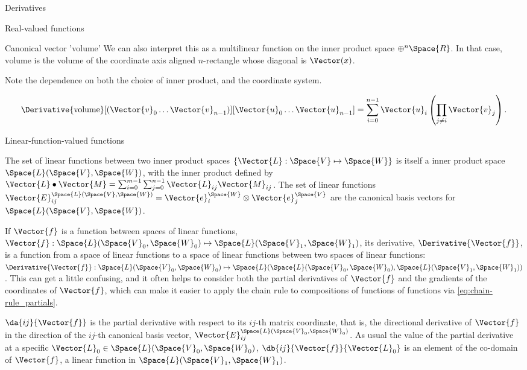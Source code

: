 \begin{plSection}{Derivatives}
\begin{plSection}{Real-valued functions}
\begin{plSection}{Canonical vector 'volume'}
We can also interpret this as a multilinear function on the
inner product space
$\oplus^{n} \Space{R}$.
In that case, $\text{volume}$ is the volume of the coordinate axis aligned
$n$-rectangle whose diagonal is $\Vector(x)$.

Note the dependence on both the choice of inner product, 
and the coordinate system.

\begin{equation}
\Derivative{\text{volume}}[(\Vector{v}_0 \ldots \Vector{v}_{n-1})][\Vector{u}_0 \ldots \Vector{u}_{n-1}]
 =  \sum_{i=0}^{n-1} \Vector{u}_i \left( \prod_{j \neq i} \Vector{v}_j \right).
\end{equation}

\end{plSection}%
\end{plSection}%
\begin{plSection}{Linear-function-valued functions}
\label{sec:Derivatives-of-linear-function-valued-functions}

The set of linear functions between two inner product spaces
$\{ \Vector{L} : \Space{V} \mapsto \Space{W} \}$
is itself a inner product space $\Space{L}(\Space{V},\Space{W})$,
with the inner product defined by
$\Vector{L} \bullet \Vector{M} = \sum_{i=0}^{m-1} \sum_{j=0}^{n-1} \Vector{L}_{ij} \Vector{M}_{ij}$.
The set of linear functions
$\Vector{E}_{ij}^{\Space{L}(\Space{V},\Space{W})}  = \Vector{e}_i^{\Space{W}} \otimes \Vector{e}_j^{\Space{V}}$
are the canonical basis vectors for $\Space{L}(\Space{V},\Space{W})$.

If $\Vector{f}$ is a function between spaces of linear functions,
$\Vector{f} : \Space{L}(\Space{V}_0,\Space{W}_0) \mapsto \Space{L}(\Space{V}_1,\Space{W}_1)$,
its derivative, $\Derivative{\Vector{f}}$,
is a function from a space of linear functions
to a space of linear functions between two
spaces of linear functions:
$\Derivative{\Vector{f}} : \Space{L}(\Space{V}_0,\Space{W}_0) \mapsto
\Space{L}(\Space{L}(\Space{V}_0,\Space{W}_0), \Space{L}(\Space{V}_1,\Space{W}_1))$.
This can get a little confusing,
and it often helps to consider both the partial derivatives of $\Vector{f}$
and the gradients of the coordinates of $\Vector{f}$,
which can make it easier to apply the chain rule to
compositions of functions of functions via \cref{eq:chain-rule_partials}.

$\da{ij}{\Vector{f}}$ is the partial derivative with respect to its $ij$-th matrix coordinate,
that is, the directional derivative of $\Vector{f}$ in the direction
of the $ij$-th canonical basis vector, $\Vector{E}_{ij}^{\Space{L}(\Space{V}_0,\Space{W}_0)}$.
As usual the value of the partial derivative at a specific
$\Vector{L}_0 \in  \Space{L}(\Space{V}_0,\Space{W}_0)$,
$\db{ij}{\Vector{f}}{\Vector{L}_0}$ is an element of the co-domain of $\Vector{f}$,
a linear function in  $\Space{L}(\Space{V}_1,\Space{W}_1)$.


\end{plSection}
\end{plSection}
